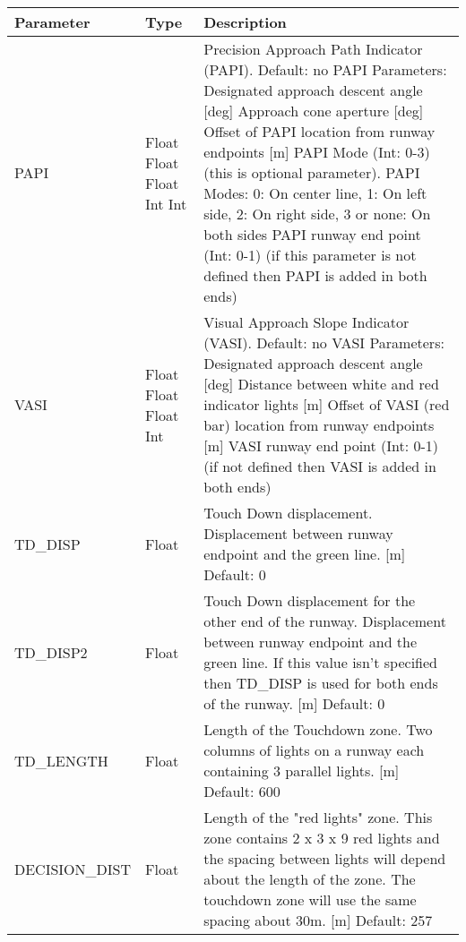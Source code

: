 \documentclass[Orbiter Developer Manual.tex]{subfiles}
\begin{document}
	\begin{longtable}{ |p{}|p{}|p{}| }
	\hline\rule{0pt}{2ex}
	\textbf{Parameter} & \textbf{Type} & \textbf{Description}\\
	\hline\rule{0pt}{2ex}
	PAPI & Float Float Float Int Int & Precision Approach Path Indicator (PAPI). Default: no PAPI\newline
	Parameters:\newline
	Designated approach descent angle [deg]\newline
	Approach cone aperture [deg]\newline
	Offset of PAPI location from runway endpoints [m]\newline
	PAPI Mode (Int: 0-3) (this is optional parameter). PAPI Modes: 0: On center line, 1: On left side, 2: On right side, 3 or none: On both sides\newline
	PAPI runway end point (Int: 0-1) (if this parameter is not defined then PAPI is added in both ends)\\
	\hline\rule{0pt}{2ex}
	VASI & Float Float Float Int & Visual Approach Slope Indicator (VASI). Default: no VASI\newline
	Parameters:\newline
	Designated approach descent angle [deg]\newline
	Distance between white and red indicator lights [m]\newline
	Offset of VASI (red bar) location from runway endpoints [m]\newline
	VASI runway end point (Int: 0-1) (if not defined then VASI is added in both ends)\\
	\hline\rule{0pt}{2ex}
	TD\_DISP & Float & Touch Down displacement. Displacement between runway endpoint and the green line. [m] Default: 0\\
	\hline\rule{0pt}{2ex}
	TD\_DISP2 & Float & Touch Down displacement for the other end of the runway. Displacement between runway endpoint and the green line. If this value isn't specified then TD\_DISP is used for both ends of the runway. [m] Default: 0\\
	\hline\rule{0pt}{2ex}
	TD\_LENGTH & Float & Length of the Touchdown zone. Two columns of lights on a runway each containing 3 parallel lights. [m] Default: 600\\
	\hline\rule{0pt}{2ex}
	DECISION\_DIST & Float & Length of the "red lights" zone. This zone contains 2 x 3 x 9 red lights and the spacing between lights will depend about the length of the zone. The touchdown zone will use the same spacing about 30m. [m] Default: 257\\

\end{longtable}
\end{document}
